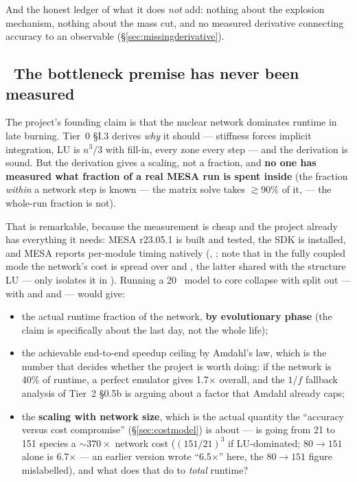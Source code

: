 And the honest ledger of what it does \emph{not} add: nothing about the
explosion mechanism, nothing about the mass cut, and no measured derivative
connecting \Ye{} accuracy to an observable (\S\ref{sec:missingderivative}).

\subsection{\texorpdfstring{\warnglyph{}~}{}The bottleneck premise has never been measured}
\label{sec:bottleneck}

The project's founding claim is that the nuclear network dominates runtime in
late burning. Tier~0 \S I.3 derives \emph{why} it should --- stiffness forces
implicit integration, LU is $n^3/3$ with fill-in, every zone every step --- and
the derivation is sound. But the derivation gives a scaling, not a fraction, and
\textbf{no one has measured what fraction of a real MESA run is spent inside
} (the fraction \emph{within} a network step is known --- the matrix
solve takes $\gtrsim 90\%$ of it, \citealt{hix1999b} --- the whole-run fraction
is not).

That is remarkable, because the measurement is cheap and the project already
has everything it needs: MESA r23.05.1 is built and tested, the SDK is
installed, and MESA reports per-module timing natively
(, ; note that in
the fully coupled mode the network's cost is spread over
 and , the latter shared
with the structure LU --- only  isolates it in
). Running a 20~\Msun{} model to core collapse with
 split out --- with  and  and  ---
would give:

\begin{itemize}
\item the actual runtime fraction of the network, \textbf{by evolutionary
  phase} (the claim is specifically about the last day, not the whole life);
\item the achievable end-to-end speedup ceiling by Amdahl's law, which is the
  number that decides whether the project is worth doing: if the network is
  40\% of runtime, a perfect emulator gives 1.7$\times$ overall, and the $1/f$
  fallback analysis of Tier~2 \S 0.5b is arguing about a factor that Amdahl
  already caps;
\item the \textbf{scaling with network size}, which is the actual quantity the
  ``accuracy versus cost compromise'' (\S\ref{sec:costmodel}) is about --- is
  going from 21 to 151 species a ${\sim}370\times$ network cost ($(151/21)^3$
  if LU-dominated; $80 \to 151$ alone is 6.7$\times$ --- an earlier version
  wrote ``6.5$\times$'' here, the $80 \to 151$ figure mislabelled), and what
  does that do to \emph{total} runtime?
\end{itemize}

